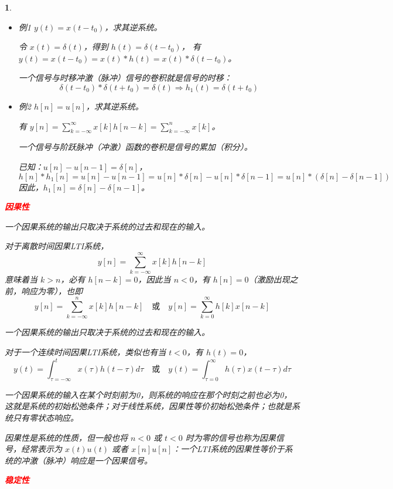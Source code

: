 \documentclass[UTF8]{report}
\theoremstyle{MyLineTheoremStyle} %
\theoremstyle{MyBlockTheoremStyle} %
\theoremstyle{MySubsubsectionStyle} %
\newtheorem{definition}{}
\begin{document}
\begin{definition}
\begin{itemize}
        \item 例1
    $y(t) = x(t - t_0)$，求其逆系统。
    
    令 $x(t) = \delta(t)$，得到 $h(t) = \delta(t - t_0)$，
    有 $y(t) = x(t - t_0) = x(t) * h(t) = x(t) * \delta(t - t_0)$。
    
    一个信号与时移冲激（脉冲）信号的卷积就是信号的时移：
    \[
    \delta(t - t_0) * \delta(t + t_0) = \delta(t) \Rightarrow h_1(t) = \delta(t + t_0)
    \]
    
        \item 例2
    $h[n] = u[n]$，求其逆系统。
    
    有 $y[n] = \sum_{k=-\infty}^{\infty} x[k] h[n - k] = \sum_{k=-\infty}^{n} x[k]$。
    
    一个信号与阶跃脉冲（冲激）函数的卷积是信号的累加（积分）。
    
    已知：$u[n] - u[n - 1] = \delta[n]$，
    \[
    h[n] * h_1[n] = u[n] - u[n - 1] = u[n] * \delta[n] - u[n] * \delta[n - 1] = u[n] * (\delta[n] - \delta[n - 1])
    \]
    因此，$h_1[n] = \delta[n] - \delta[n - 1]$。
    \end{itemize}
\vspace{1em}
    \textbf{\textcolor{red}{因果性}}\par
    一个因果系统的输出只取决于系统的过去和现在的输入。
    
    对于离散时间因果LTI系统，
    \[
    y[n] = \sum_{k=-\infty}^{\infty} x[k] h[n - k]
    \]
    意味着当 $k > n$，必有 $h[n - k] = 0$，因此当 $n < 0$，有 $h[n] = 0$（激励出现之前，响应为零），也即
    \[
    y[n] = \sum_{k=-\infty}^{n} x[k] h[n - k] \quad \text{或} \quad y[n] = \sum_{k=0}^{\infty} h[k] x[n - k]
    \]
    
    一个因果系统的输出只取决于系统的过去和现在的输入。
    
    对于一个连续时间因果LTI系统，类似也有当 $t < 0$，有 $h(t) = 0$，
    \[
    y(t) = \int_{\tau = -\infty}^{t} x(\tau) h(t - \tau) d\tau \quad \text{或} \quad y(t) = \int_{\tau = 0}^{\infty} h(\tau) x(t - \tau) d\tau
    \]
    
    一个因果系统的输入在某个时刻前为0，则系统的响应在那个时刻之前也必为0，这就是系统的初始松弛条件；对于线性系统，因果性等价初始松弛条件；也就是系统只有零状态响应。
    
    因果性是系统的性质，但一般也将 $n < 0$ 或 $t < 0$ 时为零的信号也称为因果信号，经常表示为 $x(t)u(t)$ 或者 $x[n]u[n]$：一个LTI系统的因果性等价于系统的冲激（脉冲）响应是一个因果信号。\par
\vspace{1em}
\raggedright
    \textbf{\textcolor{red}{稳定性}}
    \begin{itemize}


\end{itemize}
\end{definition}
\end{document}
